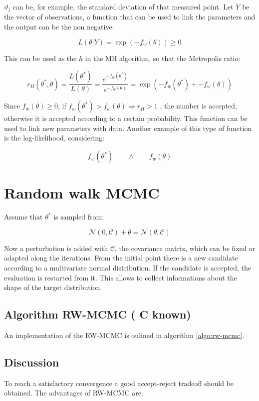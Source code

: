 $\vartheta_j$ can be, for example, the standard deviation of that measured point.
Let $Y$ be the vector of observations, a function that can be used to link the parameters and the output can be the non negative:

$$L(\theta|Y)=\exp(-f_w(\theta)) \geq 0$$

This can be used as the $h$ in the MH algorithm, so that the Metropolis ratio:

$$r_H(\theta^*,\theta)=\frac{L(\theta^*)}{L(\theta)}=\frac{e^{-f_w(\theta^*)}}{e^{-f_w(\theta)}}=\exp(-f_w(\theta^*)+-f_w(\theta))$$

Since $f_w(\theta)\geq0$, if $f_w(\theta^*) > f_w(\theta) \Rightarrow r_H>1$ , the number is accepted, otherwise it is accepted according to a certain probability.
This function can be used to link new parameters with data.
Another example of this type of function is the log-likelihood, considering:

$$f_w(\theta^*)\qquad\land\qquad f_w(\theta)$$


\section{Random walk MCMC}
Assume that $\theta^*$ is sampled from:

$$\mathcal{N}(0,\mathcal{C})+\theta=\mathcal{N}(\theta,\mathcal{C})$$

Now a perturbation is added with $\mathcal{C}$, the covariance matrix, which can be fixed or adapted along the iterations.
From the initial point there is a new candidate according to a multivariate normal distribution.
If the candidate is accepted, the evaluation is restarted from it.
This allows to collect informations about the shape of the target distribution.


  \subsection{Algorithm RW-MCMC ( C known)}
  An implementation of the RW-MCMC is oulined in algorithm \ref{algo:rw-mcmc}.

  

  \subsection{Discussion}
  To reach a satisfactory convergence a good accept-reject tradeoff should be obtained.
  The advantages of RW-MCMC are:


